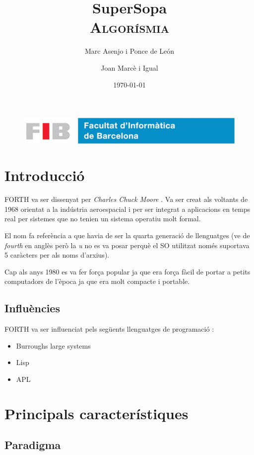\documentclass{article}
\title{
	\Huge
	\textbf{SuperSopa} \\ 
	\scshape Algorísmia
}
\author{
	Marc Asenjo i Ponce de León \and 
	Joan Marcè i Igual
}
\date{\today}
\begin{document}
\maketitle

\begin{figure}
	\centering
	\includegraphics[width=0.8\linewidth]{./simple_FIB}
\end{figure}
\newpage

\tableofcontents
\newpage

\section{Introducció}
FORTH va ser dissenyat per \emph{Charles Chuck Moore} \cite{forthEvolution}. Va ser creat als voltants de 1968 orientat a la indústria aeroespacial \cite{nasa} i per ser integrat a aplicacions en temps real per sistemes que no tenien un sistema operatiu molt formal. 

El nom fa referència a que havia de ser la quarta generació de llenguatges\cite{forthGroup} (ve de \emph{fourth} en anglès però la \emph{u} no es va posar perquè el SO utilitzat només suportava 5 caràcters per als noms d'arxius). 

Cap als anys 1980 es va fer força popular ja que era força fàcil de portar a petits computadors de l'època ja que era molt compacte i portable.

\subsection{Influències}

FORTH va ser influenciat pels següents llenguatges de programació \cite{wikipedia}:
\begin{itemize}
	\item Burroughs large systems
	\item Lisp
	\item APL
\end{itemize} 


\section{Principals característiques}
\subsection{Paradigma}
\end{document}
